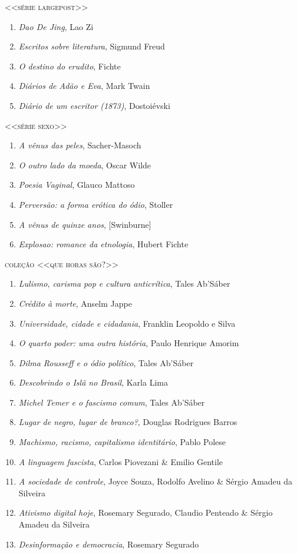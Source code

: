 \medskip
{\large\textsc{<<série largepost>>}}

\begin{enumerate}
\setlength\parskip{4.2pt}
\setlength\itemsep{-1.4mm}
\item \textit{Dao De Jing}, Lao Zi
\item \textit{Escritos sobre literatura}, Sigmund Freud
\item \textit{O destino do erudito}, Fichte
\item \textit{Diários de Adão e Eva}, Mark Twain
\item \textit{Diário de um escritor (1873)}, Dostoiévski
\end{enumerate}

\medskip
{\large\textsc{<<série sexo>>}}

\begin{enumerate}
\setlength\parskip{4.2pt}
\setlength\itemsep{-1.4mm}

\item \textit{A vênus das peles}, Sacher{}-Masoch
\item \textit{O outro lado da moeda}, Oscar Wilde
\item \textit{Poesia Vaginal}, Glauco Mattoso 
\item \textit{Perversão: a forma erótica do ódio}, Stoller
\item \textit{A vênus de quinze anos}, [Swinburne]
\item \textit{Explosao: romance da etnologia}, Hubert Fichte
\end{enumerate}

\medskip
{\large\textsc{coleção <<que horas são?>>}}

\begin{enumerate}
\setlength\parskip{4.2pt}
\setlength\itemsep{-1.4mm}
\item \textit{Lulismo, carisma pop e cultura anticrítica}, Tales Ab'Sáber
\item \textit{Crédito à morte}, Anselm Jappe
\item \textit{Universidade, cidade e cidadania}, Franklin Leopoldo e Silva
\item \textit{O quarto poder: uma outra história}, Paulo Henrique Amorim
\item \textit{Dilma Rousseff e o ódio político}, Tales Ab'Sáber
\item \textit{Descobrindo o Islã no Brasil}, Karla Lima
\item \textit{Michel Temer e o fascismo comum}, Tales Ab'Sáber
\item \textit{Lugar de negro, lugar de branco?}, Douglas Rodrigues Barros
\item \textit{Machismo, racismo, capitalismo identitário}, Pablo Polese
\item \textit{A linguagem fascista}, Carlos Piovezani \& Emilio Gentile
\item \textit{A sociedade de controle}, Joyce Souza, Rodolfo Avelino \& Sérgio Amadeu da Silveira
\item \textit{Ativismo digital hoje}, Rosemary Segurado, Claudio Penteado \& Sérgio Amadeu da Silveira
\item \textit{Desinformação e democracia}, Rosemary Segurado
\end{enumerate}

